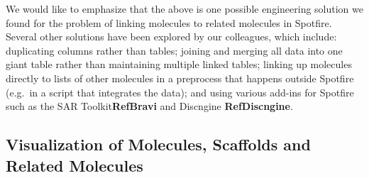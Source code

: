 \documentclass[journal=jacsat,manuscript=article]{achemso}
\newcommand*\eg{e.g.~}
\begin{document}
We would like to emphasize that the above is one possible engineering solution we found for the problem of linking molecules to related molecules in Spotfire.  Several other solutions have been explored by our colleagues, which include: duplicating columns rather than tables; joining and merging all data into one giant table rather than maintaining multiple linked tables; linking up molecules directly to lists of other molecules in a preprocess that happens outside Spotfire (\eg in a script that integrates the data); and using various add-ins for Spotfire such as the SAR Toolkit{\bf RefBravi} and Discngine {\bf RefDiscngine}.
 
\subsection{Visualization of Molecules, Scaffolds and Related Molecules}
\end{document}
